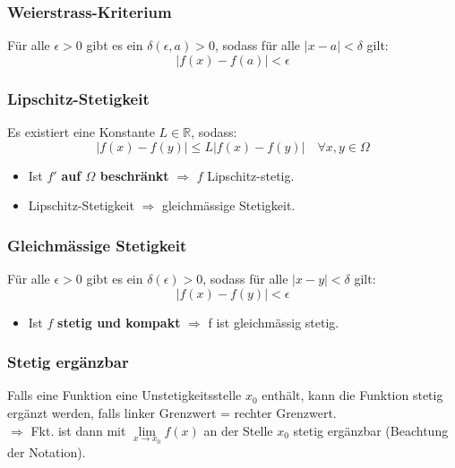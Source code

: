 \documentclass[6pt]{article}
\begin{document}
\begin{multicols*}{3}
\subsubsection*{Weierstrass-Kriterium}
\vspace{-2mm}
F{\"u}r alle $\epsilon > 0$ gibt es ein $\delta(\epsilon, a) >0$, sodass f{\"u}r alle $|x-a|<\delta$ gilt:
\begin{equation*}
	|f(x) -f(a)|<\epsilon
\end{equation*}

\subsubsection*{Lipschitz-Stetigkeit}
\vspace{-2mm}
Es existiert eine Konstante $L\in \mathbb{R}$, sodass:
\begin{equation*}
	|f(x)-f(y)|\leq L|f(x)-f(y)| \quad \forall x,y \in \Omega
\end{equation*}
\vspace{-3mm}
\begin{itemize}
	\item 	Ist $f'$ \textbf{auf $\Omega$ beschr{\"a}nkt} $\Rightarrow$ $f$ Lipschitz-stetig. 
	\item  Lipschitz-Stetigkeit $\Rightarrow$ gleichm{\"a}ssige Stetigkeit. 
\end{itemize}




	
\subsubsection*{Gleichm{\"a}ssige Stetigkeit}
\vspace{-2mm}
F{\"u}r alle $\epsilon > 0$ gibt es ein $\delta(\epsilon) >0$, sodass f{\"u}r alle $|x-y|<\delta$ gilt:
\begin{equation*}
	|f(x)-f(y)| < \epsilon
\end{equation*}
\vspace{-4mm}
\begin{itemize}
	\item Ist $f$ \textbf{stetig und kompakt} $\Rightarrow$ f ist gleichm{\"a}ssig stetig.
\end{itemize}


\subsubsection*{Stetig erg{\"a}nzbar}
\vspace{-2mm}
Falls eine Funktion eine Unstetigkeitsstelle $x_0$ enth{\"a}lt, kann die Funktion stetig erg{\"a}nzt werden, falls linker Grenzwert = rechter Grenzwert. \\
	$\Rightarrow$ Fkt. ist dann mit $\lim\limits_{x \to x_0} f(x)$ an der Stelle $x_0$ stetig erg{\"a}nzbar (Beachtung der Notation).
	

\end{multicols*}
\end{document}
